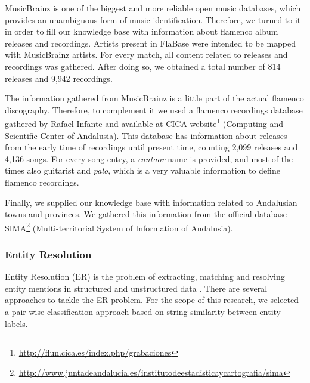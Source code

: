 MusicBrainz is one of the biggest and more reliable open music databases, which provides an unambiguous form of music identification. Therefore, we turned to it in order to fill our knowledge base with information about flamenco album releases and recordings. Artists present in FlaBase were intended to be mapped with MusicBrainz artists. For every match, all content related to releases and recordings was gathered. After doing so, we obtained a total number of 814 releases and 9,942 recordings. 

The information gathered from MusicBrainz is a little part of the actual flamenco discography. Therefore, to complement it we used a flamenco recordings database gathered by Rafael Infante and available at CICA website\footnote{\url{http://flun.cica.es/index.php/grabaciones}} (Computing and Scientific Center of Andalusia). This database has information about releases from the early time of recordings until present time, counting 2,099 releases and 4,136 songs. For every song entry, a \textit{cantaor} name is provided, and most of the times also guitarist and \textit{palo}, which is a very valuable information to define flamenco recordings.

Finally, we supplied our knowledge base with information related to Andalusian towns and provinces. We gathered this information from the official database SIMA\footnote{\url{http://www.juntadeandalucia.es/institutodeestadisticaycartografia/sima}} (Multi-territorial System of Information of Andalusia).%


\subsubsection{Entity Resolution}\label{sec:entity_resolution}

Entity Resolution (ER) is the problem of extracting, matching and resolving entity mentions in structured and unstructured data \cite{Getoor2012}. There are several approaches to tackle the ER problem. For the scope of this research, we selected a pair-wise classification approach based on string similarity between entity labels.

